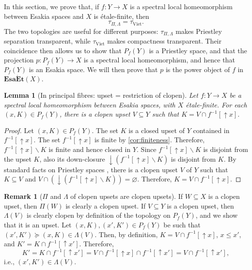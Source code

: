 \documentclass[12pt]{amsart}
\theoremstyle{plain}
\newtheorem{lemma}[theorem]{Lemma}
\theoremstyle{definition}
\newtheorem{remark}[theorem]{Remark}
\newcommand{\cat}[1]{\mathbf{#1}}
\newcommand{\Viet}{\mathrm{Viet}}
\newcommand{\EsaEt}{\cat{Esa\acute{E}t}}
\renewcommand{\u}{{\uparrow}}
\renewcommand{\d}{{\downarrow}}
\begin{document}
In this section, we prove that, if $f\colon Y\to X$ is a spectral local
homeomorphism between Esakia spaces and $X$ is étale-finite, then
\[
\tau_{\Pi,\Lambda}=\tau_{\Viet}.
\]
The two topologies are useful for different purposes: $\tau_{\Pi,\Lambda}$ makes Priestley separation transparent, while $\tau_{\Viet}$ makes compactness
transparent. Their coincidence then allows us to show that $P_f(Y)$ is a Priestley space, and that the projection
$p\colon P_f(Y)\to X$ is a spectral local homeomorphism, and hence that
$P_f(Y)$ is an Esakia space. We will then prove that $p$ is the power object of
$f$ in $\EsaEt(X)$. 


\begin{lemma}[In principal fibres: upset = restriction of clopen] \label{lem: Separation for arbitrary elements}
    Let $f \colon Y \to X$ be a spectral local homeomorphism between Esakia spaces, with $X$ étale-finite.
    For each $(x,K)\in P_{f}(Y)$, there is a clopen upset $V\subseteq Y$ such that $K=V\cap f^{-1}[{\u}x]$.
\end{lemma}

\begin{proof}
    Let $(x, K) \in P_f(Y)$.
    The set $K$ is a closed upset of $Y$ contained in $f^{-1}[{\u} x]$.
    The set $f^{-1}[{\u} x]$ is finite by \cref{cor:finiteness}.
    Therefore, $f^{-1}[{\u} x] \smallsetminus K$ is finite and hence closed in $Y$.
    Since $f^{-1}[{\u} x] \smallsetminus K$ is disjoint from the upset $K$, also its down-closure ${\d} (f^{-1}[{\u} x] \smallsetminus K)$ is disjoint from $K$.
    By standard facts on Priestley spaces \cite[Lem.~11.21]{Davey2002-lr}, there is a clopen upset $V$ of $Y$ such that $K \subseteq V$ and $V \cap ({\d} (f^{-1}[{\u} x] \smallsetminus K))=\varnothing$.
    Therefore, $K = V \cap f^{-1}[{\u}x]$.
\end{proof}

\begin{remark}[$\Pi$ and $\Lambda$ of clopen upsets are clopen upsets] \label{r:Pi-Lambda-clopen-upset}
    If $W\subseteq X$ is a clopen upset, then $\Pi(W)$ is clearly a clopen upset.
    If $V\subseteq Y$ is a clopen upset, then $\Lambda(V)$ is clearly clopen by definition of the topology on $P_f(Y)$, and we show that it is an upset. Let $(x,K), (x', K') \in P_f(Y)$ be such that $(x',K') \succeq (x,K) \in \Lambda(V)$.
    Then, by definition, $K=V\cap f^{-1}[\u x]$, $x \leq x'$, and $K' = K \cap f^{-1}[\u x']$.
    Therefore,
    \[
    K' = K \cap f^{-1}[\u x'] = V\cap f^{-1}[\u x] \cap f^{-1}[\u x'] = V \cap f^{-1}[\u x'],
    \]
    i.e., $(x',K') \in \Lambda(V)$.
\end{remark}
\end{document}
